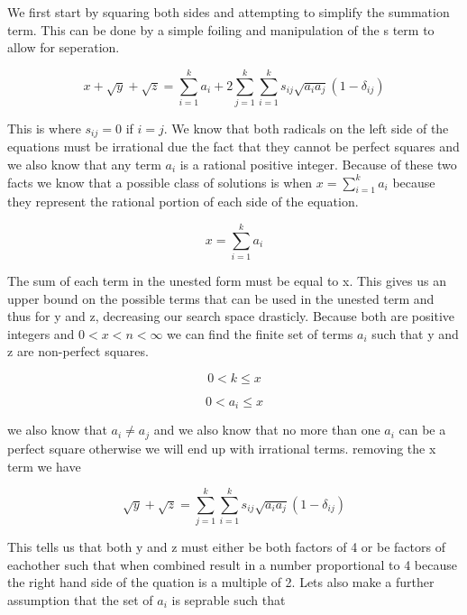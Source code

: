 \documentclass[12pt, letterpaper]{article}
\begin{document}
We first start by squaring both sides and attempting to simplify the summation term. This can be done by a simple foiling and manipulation of the s term to allow for seperation.

\begin{equation}
x + \sqrt{y} + \sqrt{z} = \sum_{i=1}^{k} a_{i} + 2\sum_{j=1}^{k}\sum_{i=1}^{k} s_{ij} \sqrt{a_{i}a_{j}} (1-\delta_{ij} )
\end{equation}

This is where $s_{ij} = 0$ if $i=j$. We know that both radicals on the left side of the equations must be irrational due the fact that they cannot be perfect squares and we also know that any term $a_{i}$ is a rational positive integer. Because of these two facts we know that a possible class of solutions is when $x =  \sum_{i=1}^{k} a_{i}$ because they represent the rational portion of each side of the equation.

\begin{equation}
x =  \sum_{i=1}^{k} a_{i}
\end{equation}

The sum of each term in the unested form must be equal to x. This gives us an upper bound on the possible terms that can be used in the unested term and thus for y and z, decreasing our search space drasticly. Because both are positive integers and $ 0 < x < n < \infty$ we can find the finite set of terms $a_{i}$ such that y and z are non-perfect squares.


\begin{equation}
0 < k \leq x
\end{equation}

\begin{equation}
0 < a_{i} \leq x
\end{equation}


we also know that $a_{i}  \ne a_{j}$ and we also know that no more than one $a_{i}$ can be a perfect square otherwise we will end up with irrational terms. removing the x term we have


\begin{equation}
\sqrt{y} + \sqrt{z} = \sum_{j=1}^{k}\sum_{i=1}^{k} s_{ij} \sqrt{a_{i}a_{j}}(1-\delta_{ij} )
\end{equation}

This tells us that both y and z must either be both factors of 4 or be factors of eachother such that when combined result in a number proportional to 4 because the right hand side of the quation is a multiple of 2. Lets also make a further assumption that the set of $ a_{i} $ is seprable such that
\end{document}

